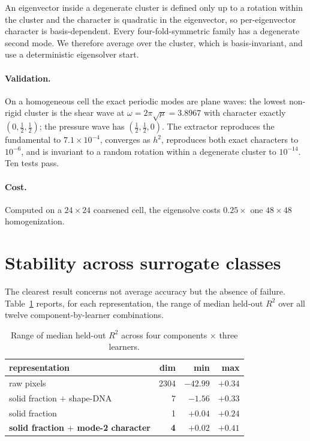 \documentclass[11pt,a4paper]{article}
\newcommand{\Rtwo}{R^{2}}
\begin{document}
An eigenvector inside a degenerate cluster is defined only up to a rotation within the
cluster and the character is quadratic in the eigenvector, so per-eigenvector character is
basis-dependent. Every four-fold-symmetric family has a degenerate second mode. We
therefore average over the cluster, which is basis-invariant, and use a deterministic
eigensolver start.

\paragraph{Validation.} On a homogeneous cell the exact periodic modes are plane waves: the
lowest non-rigid cluster is the shear wave at $\omega=2\pi\sqrt{\mu}=3.8967$ with character
exactly $(0,\tfrac12,\tfrac12)$; the pressure wave has $(\tfrac12,\tfrac12,0)$. The
extractor reproduces the fundamental to $7.1\times10^{-4}$, converges as $h^{2}$, reproduces
both exact characters to $10^{-6}$, and is invariant to a random rotation within a
degenerate cluster to $10^{-14}$. Ten tests pass.

\paragraph{Cost.} Computed on a $24\times24$ coarsened cell, the eigensolve costs $0.25\times$
one $48\times48$ homogenization.

\section{Stability across surrogate classes}
\label{sec:stab}

The clearest result concerns not average accuracy but the absence of failure.
Table~\ref{tab:stab} reports, for each representation, the range of median held-out $\Rtwo$
over all twelve component-by-learner combinations.

\begin{table}[t]
\centering\small
\caption{Range of median held-out $\Rtwo$ across four components $\times$ three learners.}
\label{tab:stab}
\begin{tabular}{lrrr}
\toprule
representation & dim & min & max \\
\midrule
raw pixels & 2304 & $-42.99$ & $+0.34$ \\
solid fraction $+$ shape-DNA & 7 & $-1.56$ & $+0.33$ \\
solid fraction & 1 & $+0.04$ & $+0.24$ \\
\textbf{solid fraction $+$ mode-2 character} & \textbf{4} & $\mathbf{+0.02}$ & $\mathbf{+0.41}$ \\
\bottomrule
\end{tabular}
\end{table}
\end{document}

